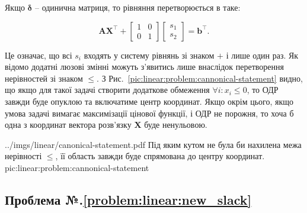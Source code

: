 \documentclass[\main/book.tex]{subfiles}
\begin{document}
Якщо $\mathbf{\delta}$ -- одинична матриця, то рівняння перетворюється в таке:


\[
 \mathbf{A} \mathbf{X}^\top +
 \left[
  \begin{array}{cc}
   1 & 0 \\
   0 & 1
  \end{array}
 \right]
 \left[
  \begin{array}{c}
   s_1 \\
   s_2
  \end{array}
 \right] = \mathbf{b}^\top\text{.}
\]

Це означає, що всі $s_i$ входять у систему рівнянь зі знаком \flqq{}$+$\frqq{} і лише один раз. Як відомо додатні люзові змінні можуть з'явитись лише внаслідок перетворення нерівностей зі знаком \flqq{}$\leq$\frqq{}. З Рис.~\ref{pic:linear:problem:cannonical-statement} видно, що якщо для такої задачі створити додаткове обмеження $\forall i: x_i \leq 0$, то ОДР завжди буде опуклою та включатиме центр координат. Якщо окрім цього, якщо умова задачі вимагає максимізації цінової функції, і ОДР не порожня, то хоча б одна з координат вектора розв'язку $\mathbf{X}$ буде ненульовою.

\illustration
 {../imgs/linear/canonical-statement.pdf}
 {Під яким кутом не була би нахилена межа нерівності \flqq{}$\leq$\frqq{}, її область завжди буде спрямована до центру координат.}
 {pic:linear:problem:cannonical-statement}

\subsection*{Проблема №.\ref{problem:linear:new_slack}}
\end{document}
